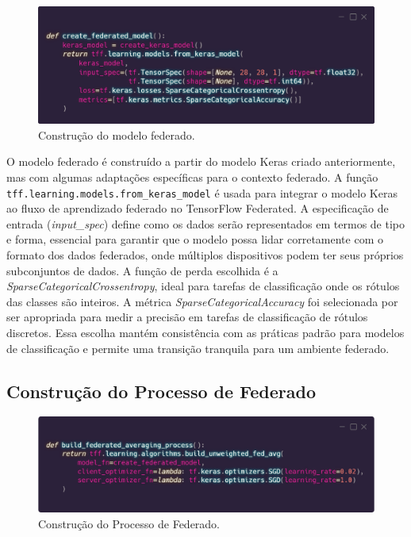 \begin{figure}[ht]
    \centering
    \includegraphics[scale=0.25]{figuras/federatedModel.eps}
    \caption{Construção do modelo federado.}
    \label{fig:federatedModel}
\end{figure}

O modelo federado é construído a partir do modelo Keras criado anteriormente, mas com algumas adaptações específicas para o contexto federado. A função \texttt{tff.learning.models.from\_keras\_model} é usada para integrar o modelo Keras ao fluxo de aprendizado federado no TensorFlow Federated. A especificação de entrada (\textit{input\_spec}) define como os dados serão representados em termos de tipo e forma, essencial para garantir que o modelo possa lidar corretamente com o formato dos dados federados, onde múltiplos dispositivos podem ter seus próprios subconjuntos de dados. A função de perda escolhida é a \textit{SparseCategoricalCrossentropy}, ideal para tarefas de classificação onde os rótulos das classes são inteiros. A métrica \textit{SparseCategoricalAccuracy} foi selecionada por ser apropriada para medir a precisão em tarefas de classificação de rótulos discretos. Essa escolha mantém consistência com as práticas padrão para modelos de classificação e permite uma transição tranquila para um ambiente federado.

\subsection{Construção do Processo de Federado}

\begin{figure}[ht]
    \centering
    \includegraphics[scale=0.25]{figuras/federatedProccess.eps}
    \caption{Construção do Processo de Federado.}
    \label{fig:federatedProccess}
\end{figure}

